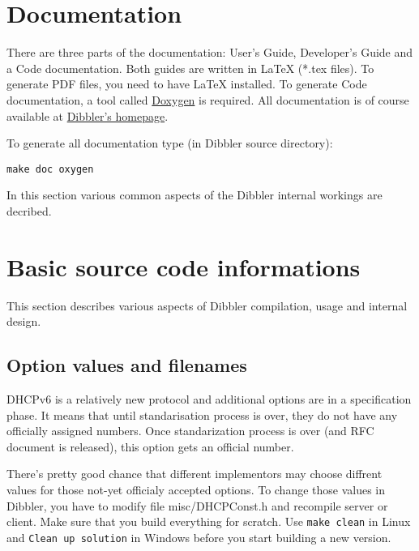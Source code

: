 
\section{Documentation}
There are three parts of the documentation: User's Guide, Developer's
Guide and a Code documentation. Both guides are written in \LaTeX
(*.tex files). To generate PDF files, you need to have \LaTeX
installed. To generate Code documentation, 
a tool called \href{http://www.doxygen.org}{Doxygen} is required. All
documentation is of course available at
\href{http://klub.com.pl/dhcpv6}{Dibbler's homepage}.

To generate all documentation type (in Dibbler source directory):
\begin{verbatim}
make doc oxygen
\end{verbatim}

In this section various common aspects of the Dibbler internal
workings are decribed.

\section{Basic source code informations}
This section describes various aspects of Dibbler compilation, usage
and internal design.

\subsection{Option values and filenames}

DHCPv6 is a relatively new protocol and additional options are in a
specification phase. It means that until standarisation process is
over, they do not have any officially assigned numbers. Once
standarization process is over (and RFC document is released), this
option gets an official number. 

There's pretty good chance that different implementors may choose
diffrent values for those not-yet officialy accepted options. To
change those values in Dibbler, you have to modify file
misc/DHCPConst.h and recompile server or client. Make sure that you
build everything for scratch. Use \verb+make clean+ in Linux and
\verb+Clean up solution+ in Windows before you start building a new
version.

